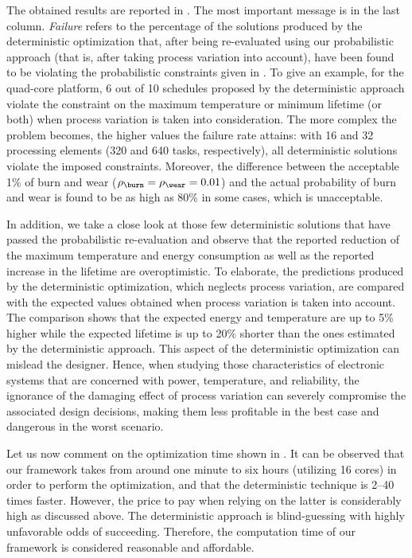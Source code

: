 The obtained results are reported in . The
most important message is in the last column. \emph{Failure} refers to the
percentage of the solutions produced by the deterministic optimization that,
after being re-evaluated using our probabilistic approach (that is, after taking
process variation into account), have been found to be violating the
probabilistic constraints given in . To
give an example, for the quad-core platform, 6 out of 10 schedules proposed by
the deterministic approach violate the constraint on the maximum temperature or
minimum lifetime (or both) when process variation is taken into consideration.
The more complex the problem becomes, the higher values the failure rate
attains: with 16 and 32 processing elements (320 and 640 tasks, respectively),
all deterministic solutions violate the imposed constraints. Moreover, the
difference between the acceptable 1\% of burn and wear ($\rho_\burn = \rho_\wear
= 0.01$) and the actual probability of burn and wear is found to be as high as
80\% in some cases, which is unacceptable.

In addition, we take a close look at those few deterministic solutions that have
passed the probabilistic re-evaluation and observe that the reported reduction
of the maximum temperature and energy consumption as well as the reported
increase in the lifetime are overoptimistic. To elaborate, the predictions
produced by the deterministic optimization, which neglects process variation,
are compared with the expected values obtained when process variation is taken
into account. The comparison shows that the expected energy and temperature are
up to 5\% higher while the expected lifetime is up to 20\% shorter than the ones
estimated by the deterministic approach. This aspect of the deterministic
optimization can mislead the designer. Hence, when studying those
characteristics of electronic systems that are concerned with power,
temperature, and reliability, the ignorance of the damaging effect of process
variation can severely compromise the associated design decisions, making them
less profitable in the best case and dangerous in the worst scenario.

Let us now comment on the optimization time shown in
. It can be observed that our framework takes
from around one minute to six hours (utilizing 16 cores) in order to perform the
optimization, and that the deterministic technique is 2--40 times faster.
However, the price to pay when relying on the latter is considerably high as
discussed above. The deterministic approach is blind-guessing with highly
unfavorable odds of succeeding. Therefore, the computation time of our framework
is considered reasonable and affordable.

